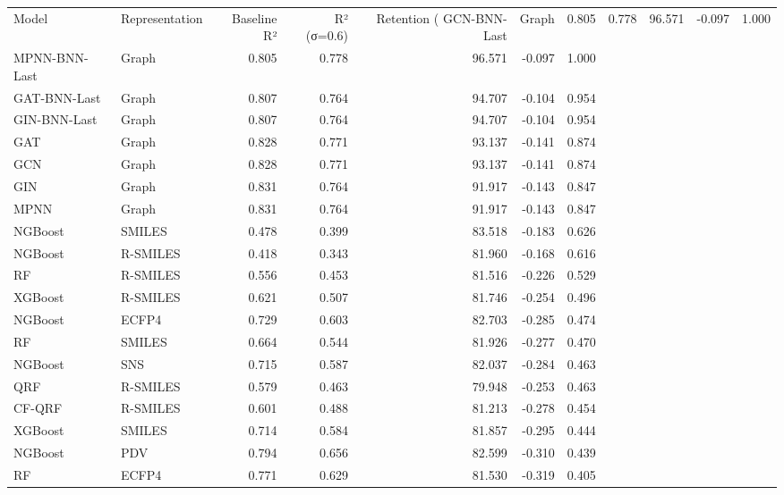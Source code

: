 \begin{tabular}{llrrrrr}
\toprule
Model & Representation & Baseline R² & R² (σ=0.6) & Retention (%
\midrule
GCN-BNN-Last & Graph & 0.805 & 0.778 & 96.571 & -0.097 & 1.000 \\
MPNN-BNN-Last & Graph & 0.805 & 0.778 & 96.571 & -0.097 & 1.000 \\
GAT-BNN-Last & Graph & 0.807 & 0.764 & 94.707 & -0.104 & 0.954 \\
GIN-BNN-Last & Graph & 0.807 & 0.764 & 94.707 & -0.104 & 0.954 \\
GAT & Graph & 0.828 & 0.771 & 93.137 & -0.141 & 0.874 \\
GCN & Graph & 0.828 & 0.771 & 93.137 & -0.141 & 0.874 \\
GIN & Graph & 0.831 & 0.764 & 91.917 & -0.143 & 0.847 \\
MPNN & Graph & 0.831 & 0.764 & 91.917 & -0.143 & 0.847 \\
NGBoost & SMILES & 0.478 & 0.399 & 83.518 & -0.183 & 0.626 \\
NGBoost & R-SMILES & 0.418 & 0.343 & 81.960 & -0.168 & 0.616 \\
RF & R-SMILES & 0.556 & 0.453 & 81.516 & -0.226 & 0.529 \\
XGBoost & R-SMILES & 0.621 & 0.507 & 81.746 & -0.254 & 0.496 \\
NGBoost & ECFP4 & 0.729 & 0.603 & 82.703 & -0.285 & 0.474 \\
RF & SMILES & 0.664 & 0.544 & 81.926 & -0.277 & 0.470 \\
NGBoost & SNS & 0.715 & 0.587 & 82.037 & -0.284 & 0.463 \\
QRF & R-SMILES & 0.579 & 0.463 & 79.948 & -0.253 & 0.463 \\
CF-QRF & R-SMILES & 0.601 & 0.488 & 81.213 & -0.278 & 0.454 \\
XGBoost & SMILES & 0.714 & 0.584 & 81.857 & -0.295 & 0.444 \\
NGBoost & PDV & 0.794 & 0.656 & 82.599 & -0.310 & 0.439 \\
RF & ECFP4 & 0.771 & 0.629 & 81.530 & -0.319 & 0.405 \\
\bottomrule
\end{tabular}
